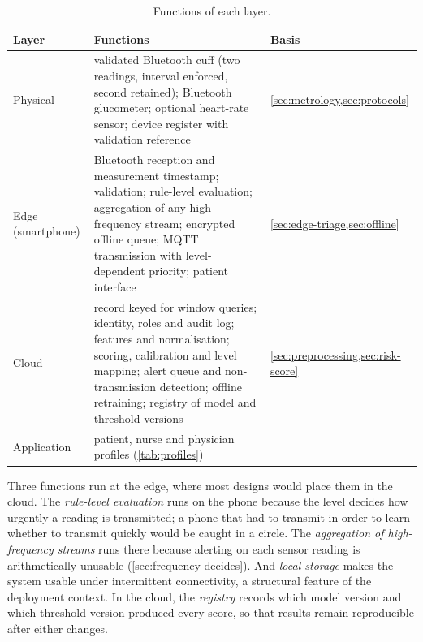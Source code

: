 \begin{table}[htbp]
\centering\footnotesize
\caption{Functions of each layer.}\label{tab:layer-functions}\label{tab:edge-layer}\label{tab:physical-layer}
\begin{tabularx}{\textwidth}{@{}>{\raggedright\arraybackslash}p{2.2cm} X >{\raggedright\arraybackslash}p{3.0cm}@{}}
\toprule
\textbf{Layer} & \textbf{Functions} & \textbf{Basis} \\
\midrule
Physical & validated Bluetooth cuff (two readings, interval enforced, second retained); Bluetooth glucometer; optional heart-rate sensor; device register with validation reference & \cref{sec:metrology,sec:protocols} \\
Edge (smartphone) & Bluetooth reception and measurement timestamp; validation; rule-level evaluation; aggregation of any high-frequency stream; encrypted offline queue; MQTT transmission with level-dependent priority; patient interface & \cref{sec:edge-triage,sec:offline} \\
Cloud & record keyed for window queries; identity, roles and audit log; features and normalisation; scoring, calibration and level mapping; alert queue and non-transmission detection; offline retraining; registry of model and threshold versions & \cref{sec:preprocessing,sec:risk-score} \\
Application & patient, nurse and physician profiles (\cref{tab:profiles}) & \textcite{mucchi2021} \\
\bottomrule
\end{tabularx}
\end{table}

Three functions run at the edge, where most designs would place them in the cloud. The \emph{rule-level evaluation} runs on the phone because the level decides how urgently a reading is transmitted; a phone that had to transmit in order to learn whether to transmit quickly would be caught in a circle. The \emph{aggregation of high-frequency streams} runs there because alerting on each sensor reading is arithmetically unusable (\cref{sec:frequency-decides}). And \emph{local storage} makes the system usable under intermittent connectivity, a structural feature of the deployment context. In the cloud, the \emph{registry} records which model version and which threshold version produced every score, so that results remain reproducible after either changes.

